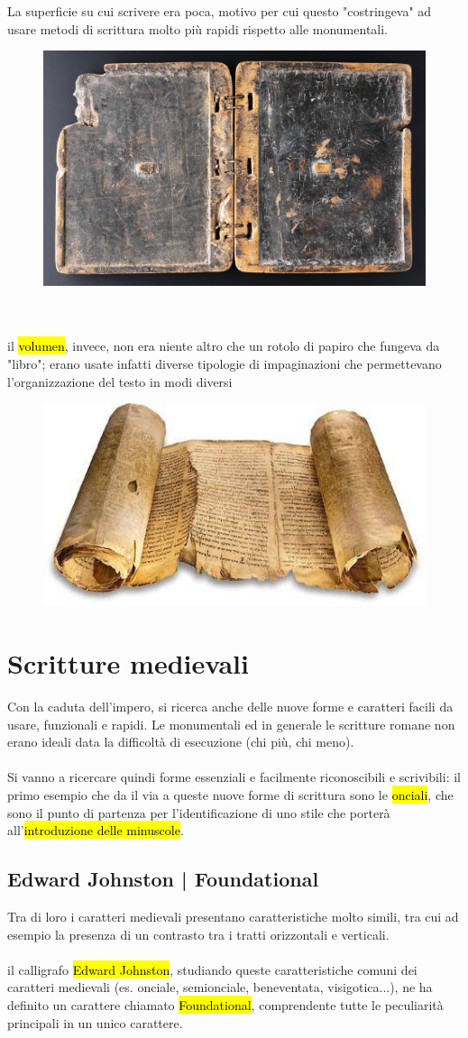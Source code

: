 La superficie su cui scrivere era poca, motivo per cui questo "costringeva" ad usare metodi di scrittura molto più rapidi rispetto alle monumentali.
\begin{figure}[H]
    \centering
    \includegraphics[width=0.3\linewidth]{lezione_3/imgs/varivs_scriptio20b.jpg}
\end{figure}
\\\\
il \hl{volumen}, invece, non era niente altro che un rotolo di papiro che fungeva da "libro"; erano usate infatti diverse tipologie di impaginazioni che permettevano l'organizzazione del testo in modi diversi
\begin{figure}[H]
    \centering
    \includegraphics[width=0.3\linewidth]{lezione_3/imgs/17495684_10209129661334783_1817188107_n-1.jpg}
\end{figure}
\section{Scritture medievali}
Con la caduta dell'impero, si ricerca anche delle nuove forme e caratteri facili da usare, funzionali e rapidi. Le monumentali ed in generale le scritture romane non erano ideali data la difficoltà di esecuzione (chi più, chi meno).
\\\\
Si vanno a ricercare quindi forme essenziali e facilmente riconoscibili e scrivibili: il primo esempio che da il via a queste nuove forme di scrittura sono le \hl{onciali}, che sono il punto di partenza per l'identificazione di uno stile che porterà all'\hl{introduzione delle minuscole}.

\subsection{Edward Johnston | Foundational}
Tra di loro i caratteri medievali presentano caratteristiche molto simili, tra cui ad esempio la presenza di un contrasto tra i tratti orizzontali e verticali.
\\\\
il calligrafo \hl{Edward Johnston}, studiando queste caratteristiche comuni dei caratteri medievali (es. onciale, semionciale, beneventata, visigotica...), ne ha definito un carattere chiamato \hl{Foundational}, comprendente tutte le peculiarità principali in un unico carattere.
